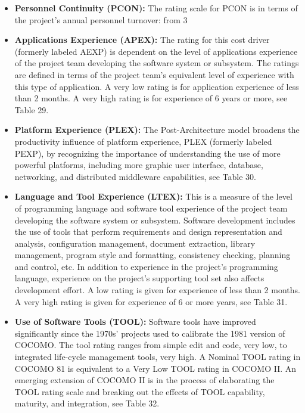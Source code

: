 \begin{itemize}
	\item\textbf{Personnel Continuity (PCON):} The rating scale for PCON is in terms of the project’s annual personnel turnover: from
	3%
	
	\item\textbf{Applications Experience (APEX):} The rating for this cost driver (formerly labeled AEXP) is dependent on the level of
	applications experience of the project team developing the software system or subsystem. The
	ratings are defined in terms of the project team’s equivalent level of experience with this type of
	application. A very low rating is for application experience of less than 2 months. A very high
	rating is for experience of 6 years or more, see Table 29. 
	
	\item\textbf{Platform Experience (PLEX):} The Post-Architecture model broadens the productivity influence of platform experience,
	PLEX (formerly labeled PEXP), by recognizing the importance of understanding the use of more
	powerful platforms, including more graphic user interface, database, networking, and distributed
	middleware capabilities, see Table 30. 
	
	\item\textbf{Language and Tool Experience (LTEX):} This is a measure of the level of programming language and software tool experience of
	the project team developing the software system or subsystem. Software development includes
	the use of tools that perform requirements and design representation and analysis, configuration
	management, document extraction, library management, program style and formatting,
	consistency checking, planning and control, etc. In addition to experience in the project’s
	programming language, experience on the project’s supporting tool set also affects development
	effort. A low rating is given for experience of less than 2 months. A very high rating is given
	for experience of 6 or more years, see Table 31. 
	
	\item\textbf{Use of Software Tools (TOOL):} Software tools have improved significantly since the 1970s’ projects used to calibrate the
	1981 version of COCOMO. The tool rating ranges from simple edit and code, very low, to
	integrated life-cycle management tools, very high. A Nominal TOOL rating in COCOMO 81 is
	equivalent to a Very Low TOOL rating in COCOMO II. An emerging extension of COCOMO II
	is in the process of elaborating the TOOL rating scale and breaking out the effects of TOOL
	capability, maturity, and integration, see Table 32. 
	

\end{itemize}
